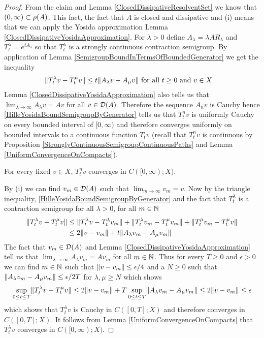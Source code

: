 \begin{proof}
From the claim and Lemma \ref{ClosedDissipativeResolventSet} we know that $(0,\infty) \subset \rho(A)$.  This fact, the fact that $A$ is closed and dissipative and (i) means that we can apply the Yosida approximation Lemma \ref{ClosedDissipativeYosidaApproximation}.  For $\lambda>0$ define $A_\lambda =\lambda A R_\lambda$ and $T^\lambda_t = e^{tA_\lambda}$ so that $T^\lambda_t$ is a strongly continuous contraction semigroup.  By application of Lemma \ref {SemigroupBoundInTermsOfBoundedGenerator} we get the inequality
\begin{align}\label{HilleYosidaBoundSemigroupByGenerator}
\lVert T^\lambda_tv  - T^\mu_tv \rVert &\leq t\lVert A_\lambda v - A_\mu v \rVert \text{ for all $t\geq 0$ and $v \in X$}
\end{align}
Lemma \ref{ClosedDissipativeYosidaApproximation} also tells us that $\lim_{\lambda \to \infty} A_\lambda v = Av$ for all $v \in \mathcal{D}(A)$.  Therefore the sequence $A_n v$ is Cauchy
hence \eqref{HilleYosidaBoundSemigroupByGenerator} tells us that $T^n_t v$ is uniformly Cauchy on every bounded interval of $[0, \infty)$ and therefore converges uniformly on bounded intervals to a continuous function $T_t v$ (recall that $T^n_t v$ is continuous by Proposition \ref{StronglyContinuousSemigroupContinuousPaths} and Lemma \ref{UniformConvergenceOnCompacts}).

\begin{clm} For every fixed $v \in X$, $T^n_t v$ converges in $C([0,\infty); X)$.
\end{clm}
By (i) we can find $v_m \in \mathcal{D}(A)$ such that $\lim_{m \to \infty} v_m = v$.  
Now by the triangle inequality, \eqref{HilleYosidaBoundSemigroupByGenerator} and the fact that $T^\lambda_t$ is a contraction semigroup for all $\lambda > 0$, for all $m \in \mathbb{N}$
\begin{align*}
\lVert T^\lambda_t v - T^\mu_t v \rVert &\leq  \lVert T^\lambda_t v - T^\lambda_t v_m \rVert   + \lVert T^\lambda_t v_m - T^\mu_t v_m \rVert + \lVert T^\mu_t v_m - T^\mu_t v \rVert \\
&\leq 2 \lVert v -v_m \rVert + t \lVert A_\lambda v_m - A_\mu v_m \rVert
\end{align*}
The fact that $v_m \in \mathcal{D}(A)$ and Lemma \ref{ClosedDissipativeYosidaApproximation} tell us that $\lim_{\lambda \to \infty} A_\lambda v_m = Av_m$  for all $m \in \mathbb{N}$. Thus for every $T \geq 0$ and $\epsilon > 0$ we can find $m \in \mathbb{N}$ such that $\lVert v -v_m \rVert \leq \epsilon/4$ and a $N \geq 0$ such that $\lVert A_\lambda v_m - A_\mu v_m \rVert \leq \epsilon/2T$ for $\lambda, \mu \geq N$ which shows
\begin{align*}
\sup_{0 \leq t \leq T} \lVert T^\lambda_t v - T^\mu_t v \rVert \leq 2 \lVert v -v_m \rVert + T \sup_{0 \leq t \leq T} \lVert A_\lambda v_m - A_\mu v_m \rVert \leq 2 \lVert v -v_m \rVert \leq \epsilon
\end{align*}
which shows that $T^\lambda_t v$ is Cauchy in $C([0,T];X)$ and therefore converges in $C([0,T];X)$.  It follows from Lemma \ref{UniformConvergenceOnCompacts} that $T^\lambda_t v$ converges in $C([0,\infty); X)$.


\end{proof}
